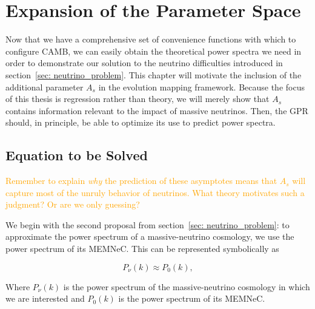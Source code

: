 \chapter{Expansion of the Parameter Space}
\label{chap: A_s}

Now that we have a comprehensive set of convenience functions with which to
configure CAMB, we can easily obtain the theoretical power spectra we need in
order to demonstrate our solution to the neutrino difficulties introduced in
section~\ref{sec: neutrino_problem}. This chapter will motivate the inclusion 
of the additional parameter $A_s$ in the evolution mapping framework.
Because the focus of this thesis is regression rather than theory,
we will merely show that $A_s$ contains information relevant to the impact of
massive neutrinos. Then, the GPR should, in principle, be able to optimize its
use to predict power spectra.


\section{Equation to be Solved}


\textcolor{orange}{Remember to explain \textit{why} the prediction of these 
asymptotes means that $A_s$ will capture most of the unruly behavior of 
neutrinos. What theory motivates such a judgment? Or are we only guessing?}

We begin with the second proposal from section~\ref{sec: neutrino_problem}:
to approximate the power spectrum of a massive-neutrino cosmology, we use the
power spectrum of its MEMNeC. This can be represented symbolically as

\begin{equation}
\label{eq: MEMNeC_approx}
P_\nu(k) \approx P_0 (k)
,\end{equation}

Where $P_\nu (k)$ is the power spectrum of the massive-neutrino cosmology in
which we are interested and $P_0(k)$ is the power spectrum of its MEMNeC.


